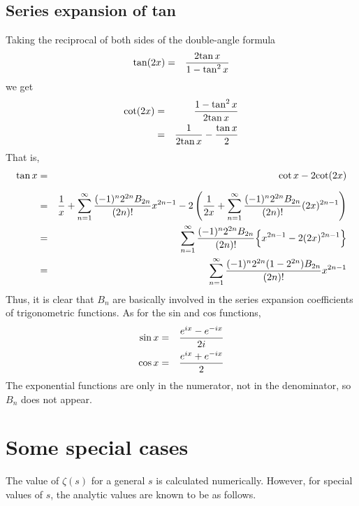 \documentclass[uplatex,a4j,12pt,dvipdfmx]{jsarticle}
\begin{document}
\subsection{Series expansion of tan}

Taking the reciprocal of both sides of the double-angle formula
\begin{eqnarray}
	{\rm tan} (2x)
	&=&
	\dfrac{ 2 {\rm tan} \ \! x }{ 1 - {\rm tan}^{2} \ \! x }
\end{eqnarray}
we get
\begin{eqnarray}
	{\rm cot} (2x)
	&=&
	\dfrac{ 1 - {\rm tan}^{2} \ \! x }{2 {\rm tan} \ \! x }
	\nonumber \\ &=&
	\dfrac{1}{2 {\rm tan} \ \! x }
	-
	\dfrac{{\rm tan} \ \! x}{2}
\end{eqnarray}
That is,
\begin{eqnarray}
	{\rm tan} \ \! x
	&=&
	{ \rm cot } \ \! x
	-
	2 { \rm cot } (2x)
	\nonumber \\[2mm] &=&
	\dfrac{1}{x}
	+
	\sum_{n=1}^{\infty}
	\dfrac{(-1)^{n} 2^{2n} B_{2n} }{(2n)!}
	x^{2n-1}
	-
	2
	\left(
	\dfrac{1}{2x}
	+
	\sum_{n=1}^{\infty}
	\dfrac{(-1)^{n} 2^{2n} B_{2n} }{(2n)!}
		(2x)^{2n-1}
	\right)
	\nonumber \\ &=&
	\sum_{n=1}^{\infty}
	\dfrac{(-1)^{n} 2^{2n} B_{2n} }{(2n)!}
	\Big\{
	x^{2n-1}
	-
	2
	(2x)^{2n-1}
	\Big\}
	\nonumber \\ &=&
	\sum_{n=1}^{\infty}
	\dfrac{(-1)^{n} 2^{2n} ( 1 - 2^{2n} ) B_{2n} }{(2n)!}
	x^{2n-1}
\end{eqnarray}
Thus, it is clear that $B_{n}$ are basically involved in the series expansion coefficients of trigonometric functions.
As for the sin and cos functions,
\begin{eqnarray}
	{\rm sin} \ \! x
	&=&
	\dfrac{e^{ix} - e^{-ix}}{2i}
	\\
	{\rm cos} \ \! x
	&=&
	\dfrac{e^{ix} + e^{-ix}}{2}
\end{eqnarray}
The exponential functions are only in the numerator, not in the denominator, so $B_{n}$ does not appear.




\section{Some special cases}

The value of $\zeta(s)$ for a general $s$ is calculated numerically.
However, for special values of $s$, the analytic values are known to be as follows.
\end{document}
